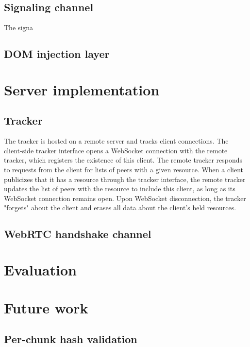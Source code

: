 \documentclass[letterpaper,twocolumn,10pt]{article}
\begin{document}
\subsection{Signaling channel}

The signa

\subsection{DOM injection layer}


\section{Server implementation}

\subsection{Tracker}
The tracker is hosted on a remote server and tracks client connections. 
The client-side tracker interface  opens a WebSocket connection with the remote tracker, 
which registers the existence of this client. The remote tracker responds to
requests from the client for lists of peers with a given resource. When a client
publicizes that it has a resource through the tracker interface, the remote tracker updates
the list of peers with the resource to include this client, as 
long as its WebSocket connection remains open. Upon WebSocket disconnection, 
the tracker "forgets" about the client and erases all data about the client's 
held resources.

\subsection{WebRTC handshake channel}



\section{Evaluation}


\section{Future work}

\subsection{Per-chunk hash validation}
\end{document}

